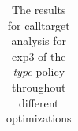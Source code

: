 \begin{table}[!htbp]
{\begin{tabular}{l|c|c|c}
    	\end{tabular}
%
%
%	
%
%
%
%	
%	
%	
%
%
%
}
		\caption {The results for calltarget analysis for exp3 of the \textit{type} policy throughout different optimizations}
		\label{tbl:CTdestinterexp34TYPE}
\end{table}




